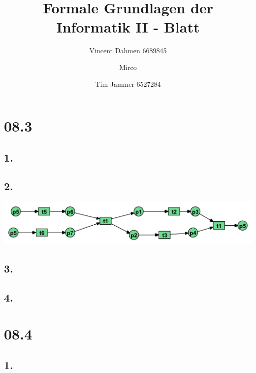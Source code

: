 \documentclass[12pt,a4paper]{article}
\title{Formale Grundlagen der Informatik II - Blatt \blattNr}
\author{Vincent Dahmen 6689845  \and Mirco \and Tim Jammer 6527284}
\def \blattNr{08}
\begin{document}
\maketitle{}

\section*{\blattNr .3}
\subsection*{1.}


\subsection*{2.}
%
\includegraphics[scale=0.75]{Teilaufgaben/03-2.pdf}

\subsection*{3.}


\subsection*{4.}


%
%
%

\pagebreak

\section*{\blattNr .4}

\subsection*{1.}
\end{document}
